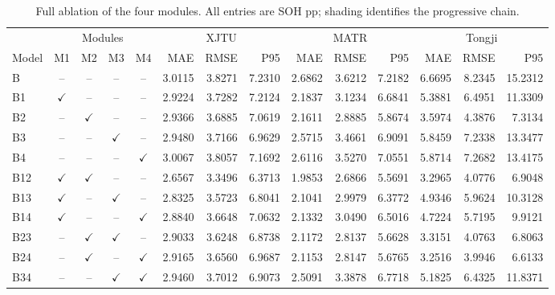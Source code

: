 \begin{table}[!htbp]\centering
\caption{Full ablation of the four modules. All entries are SOH pp; shading identifies the progressive chain.}\label{tab:fullablation}
\papertablesize\setlength{\tabcolsep}{1.5pt}\renewcommand{\arraystretch}{1.15}
\begin{tabular}{lcccc*{9}{r}}\toprule
&\multicolumn{4}{c}{Modules}&\multicolumn{3}{c}{XJTU}&\multicolumn{3}{c}{MATR}&\multicolumn{3}{c}{Tongji}\\
\cmidrule(lr){2-5}\cmidrule(lr){6-8}\cmidrule(lr){9-11}\cmidrule(lr){12-14}
Model & M1 & M2 & M3 & M4 & MAE & RMSE & P95 & MAE & RMSE & P95 & MAE & RMSE & P95\\\midrule
\rowcolor{gray!12}
B & -- & -- & -- & -- & 3.0115 & 3.8271 & 7.2310 & 2.6862 & 3.6212 & 7.2182 & 6.6695 & 8.2345 & 15.2312 \\
\rowcolor{gray!12}
B1 & $\checkmark$ & -- & -- & -- & 2.9224 & 3.7282 & 7.2124 & 2.1837 & 3.1234 & 6.6841 & 5.3881 & 6.4951 & 11.3309 \\
B2 & -- & $\checkmark$ & -- & -- & 2.9366 & 3.6885 & 7.0619 & 2.1611 & 2.8885 & 5.8674 & 3.5974 & 4.3876 & 7.3134 \\
B3 & -- & -- & $\checkmark$ & -- & 2.9480 & 3.7166 & 6.9629 & 2.5715 & 3.4661 & 6.9091 & 5.8459 & 7.2338 & 13.3477 \\
B4 & -- & -- & -- & $\checkmark$ & 3.0067 & 3.8057 & 7.1692 & 2.6116 & 3.5270 & 7.0551 & 5.8714 & 7.2682 & 13.4175 \\
\rowcolor{gray!12}
B12 & $\checkmark$ & $\checkmark$ & -- & -- & 2.6567 & 3.3496 & 6.3713 & 1.9853 & 2.6866 & 5.5691 & 3.2965 & 4.0776 & 6.9048 \\
B13 & $\checkmark$ & -- & $\checkmark$ & -- & 2.8325 & 3.5723 & 6.8041 & 2.1041 & 2.9979 & 6.3772 & 4.9346 & 5.9624 & 10.3128 \\
B14 & $\checkmark$ & -- & -- & $\checkmark$ & 2.8840 & 3.6648 & 7.0632 & 2.1332 & 3.0490 & 6.5016 & 4.7224 & 5.7195 & 9.9121 \\
B23 & -- & $\checkmark$ & $\checkmark$ & -- & 2.9033 & 3.6248 & 6.8738 & 2.1172 & 2.8137 & 5.6628 & 3.3151 & 4.0763 & 6.8063 \\
B24 & -- & $\checkmark$ & -- & $\checkmark$ & 2.9165 & 3.6560 & 6.9687 & 2.1153 & 2.8147 & 5.6765 & 3.2516 & 3.9946 & 6.6133 \\
B34 & -- & -- & $\checkmark$ & $\checkmark$ & 2.9460 & 3.7012 & 6.9073 & 2.5091 & 3.3878 & 6.7718 & 5.1825 & 6.4325 & 11.8371 \\

\end{tabular}
\end{table}

